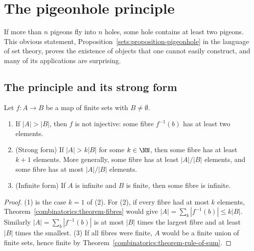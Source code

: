 \section{The pigeonhole principle}\label{combinatorics:section-pigeonhole}

If more than $n$ pigeons fly into $n$ holes, some hole contains at least two pigeons. This obvious statement, Proposition~\ref{sets:proposition-pigeonhole} in the language of set theory, proves the
existence of objects that one cannot easily construct, and many of its applications are surprising.

\subsection{The principle and its strong form}\label{combinatorics:subsection-pigeonhole-principle}

\begin{theorem}\label{combinatorics:theorem-pigeonhole}
Let $f \colon A \to B$ be a map of finite sets with $B \neq \emptyset$.
\begin{enumerate}
\item If $|A| > |B|$, then $f$ is not injective: some fibre $f^{-1}(b)$ has at least two elements.
\item (Strong form) If $|A| > k|B|$ for some $k \in \NN$, then some fibre has at least $k + 1$ elements. More generally, some fibre has at least $|A|/|B|$ elements, and some fibre has at most
$|A|/|B|$ elements.
\item (Infinite form) If $A$ is infinite and $B$ is finite, then some fibre is infinite.
\end{enumerate}
\end{theorem}

\begin{proof}
(1) is the case $k = 1$ of (2). For (2), if every fibre had at most $k$ elements, Theorem~\ref{combinatorics:theorem-fibres} would give $|A| = \sum_b|f^{-1}(b)| \leq k|B|$. Similarly
$|A| = \sum_b|f^{-1}(b)|$ is at most $|B|$ times the largest fibre and at least $|B|$ times the smallest. (3) If all fibres were finite, $A$ would be a finite union of finite sets, hence finite by
Theorem~\ref{combinatorics:theorem-rule-of-sum}.
\end{proof}

